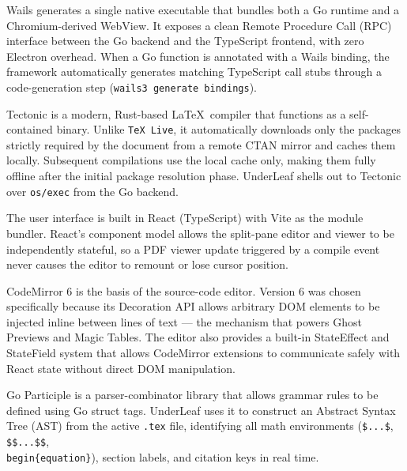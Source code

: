 \documentclass[11pt, a4paper]{article}
\begin{document}
\begin{description}[style=nextline, leftmargin=2cm]
    \item[\texttt{Wails v3} (App Framework)]
    Wails generates a single native executable that bundles both a Go runtime and a Chromium-derived WebView. It exposes a clean Remote Procedure Call (RPC) interface between the Go backend and the TypeScript frontend, with zero Electron overhead. When a Go function is annotated with a Wails binding, the framework automatically generates matching TypeScript call stubs through a code-generation step (\texttt{wails3 generate bindings}).

    \item[\texttt{Tectonic} (Compilation Engine)]
    Tectonic is a modern, Rust-based \LaTeX\ compiler that functions as a self-contained binary. Unlike \texttt{TeX Live}, it automatically downloads only the packages strictly required by the document from a remote CTAN mirror and caches them locally. Subsequent compilations use the local cache only, making them fully offline after the initial package resolution phase. UnderLeaf shells out to Tectonic over \texttt{os/exec} from the Go backend.

    \item[\texttt{React + Vite} (Frontend UI)]
    The user interface is built in React (TypeScript) with Vite as the module bundler. React's component model allows the split-pane editor and viewer to be independently stateful, so a PDF viewer update triggered by a compile event never causes the editor to remount or lose cursor position.

    \item[\texttt{CodeMirror 6} (Editor Core)]
    CodeMirror 6 is the basis of the source-code editor. Version 6 was chosen specifically because its Decoration API allows arbitrary DOM elements to be injected inline between lines of text — the mechanism that powers Ghost Previews and Magic Tables. The editor also provides a built-in StateEffect and StateField system that allows CodeMirror extensions to communicate safely with React state without direct DOM manipulation.

    \item[\texttt{Go Participle} (AST Parser)]
    Go Participle is a parser-combinator library that allows grammar rules to be defined using Go struct tags. UnderLeaf uses it to construct an Abstract Syntax Tree (AST) from the active \texttt{.tex} file, identifying all math environments (\texttt{\$...\$}, \texttt{\$\$...\$\$}, \texttt{\\begin\{equation\}}), section labels, and citation keys in real time.


\end{description}
\end{document}
